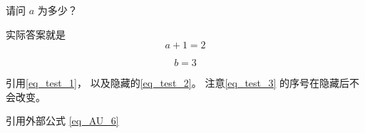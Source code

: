 \begin{example}{}
请问 $a$ 为多少？
\pay

实际答案就是
\begin{equation}\label{eq_test_2}
a + 1 = 2
\end{equation}
\paid
\end{example}

\begin{equation}\label{eq_test_3}
b = 3
\end{equation}


引用\autoref{eq_test_1}， 以及隐藏的\autoref{eq_test_2}。 注意\autoref{eq_test_3} 的序号在隐藏后不会改变。

引用外部公式 \autoref{eq_AU_6}~
